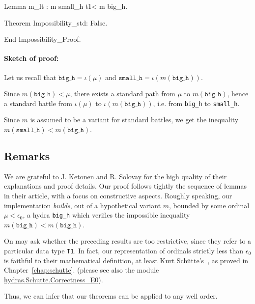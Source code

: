 \begin{Coqsrc}
  Lemma m_lt : m small_h  t1< m big_h.

  Theorem Impossibility_std: False.

End Impossibility_Proof.
\end{Coqsrc}




\paragraph*{Sketch of proof:} Let us recall that $\texttt{big\_h} = \iota(\mu)$
 and $\texttt{small\_h} = \iota (m (\texttt{big\_h}))$.

Since $m(\texttt{big\_h})< \mu$, there exists a standard path from $\mu$ to
$m(\texttt{big\_h})$, hence a   standard battle from $\iota(\mu)$  to
$\iota(m(\texttt{big\_h}))$,  i.e. from \texttt{big\_h} to \texttt{small\_h}.

Since $m$ is assumed to be a variant for standard battles, we get the inequality  $m(\texttt{small\_h}) < m(\texttt{big\_h})$.





\subsection{Remarks}

We are grateful to 
 J. Ketonen and R. Solovay  for the high quality of their explanations and proof details.
Our proof follows tightly the sequence of lemmas in their article, with a focus on 
constructive aspects.
Roughly speaking, our implementation \emph{builds}, out of a hypothetical
  variant $m$, bounded by some ordinal $\mu<\epsilon_0$, a hydra \texttt{big\_h} which verifies the impossible inequality  $m(\texttt{big\_h})< m(\texttt{big\_h})$.



On may ask whether the preceding results are too restrictive, since they 
refer to a particular data type \texttt{T1}.
In fact, our representation of ordinals strictly less than 
 $\epsilon_0$ is faithful to their mathematical definition, at least 
Kurt Schütte's~\cite{schutte}, as proved in Chapter~\vref{chap:schutte}.
(please see also the module
\href{../theories/html/hydras.Schutte.Correctness_E0.html}{hydras.Schutte.Correctness\_E0}).

Thus, we can infer that our theorems can be applied to any well order.

